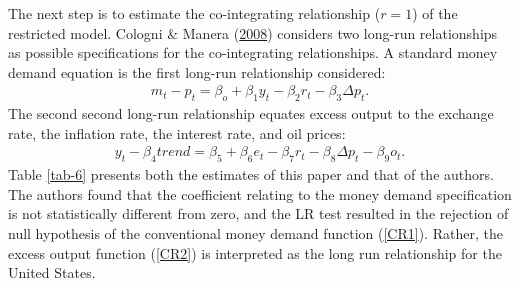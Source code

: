 \documentclass[11pt,preprint, authoryear]{elsarticle}
\numberwithin{equation}{section}
\numberwithin{figure}{section}
\numberwithin{table}{section}
\begin{document}
The next step is to estimate the co-integrating relationship (\(r=1\))
of the restricted model. Cologni \& Manera
(\protect\hyperlink{ref-cologni2008}{2008}) considers two long-run
relationships as possible specifications for the co-integrating
relationships. A standard money demand equation is the first long-run
relationship considered: \begin{align}
m_t - p_t = \beta_o + \beta_1 y_t - \beta_2 r_t - \beta_3 \Delta p_t. \label{CR1}
\end{align} The second second long-run relationship equates excess
output to the exchange rate, the inflation rate, the interest rate, and
oil prices: \begin{align}
y_t - \beta_4 trend = \beta_5 + \beta_6 e_t - \beta_7 r_t - \beta_8 \Delta p_t - \beta_9 o_t. \label{CR2}
\end{align} Table \ref{tab-6} presents both the estimates of this paper
and that of the authors. The authors found that the coefficient relating
to the money demand specification is not statistically different from
zero, and the LR test resulted in the rejection of null hypothesis of
the conventional money demand function (\ref{CR1}). Rather, the excess
output function (\ref{CR2}) is interpreted as the long run relationship
for the United States.
\end{document}
